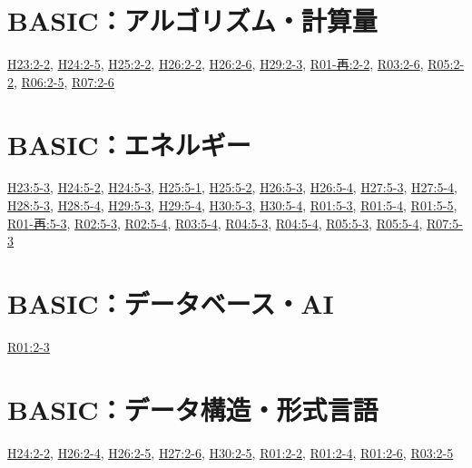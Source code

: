 \section{BASIC：アルゴリズム・計算量}
\hyperref[q:h23-reg-basic-2-2]{H23:2-2}, \hyperref[q:h24-reg-basic-2-5]{H24:2-5}, \hyperref[q:h25-reg-basic-2-2]{H25:2-2}, \hyperref[q:h26-reg-basic-2-2]{H26:2-2}, \hyperref[q:h26-reg-basic-2-6]{H26:2-6}, \hyperref[q:h29-reg-basic-2-3]{H29:2-3}, \hyperref[q:r01-ret-basic-2-2]{R01-再:2-2}, \hyperref[q:r03-reg-basic-2-6]{R03:2-6}, \hyperref[q:r05-reg-basic-2-2]{R05:2-2}, \hyperref[q:r06-reg-basic-2-5]{R06:2-5}, \hyperref[q:r07-reg-basic-2-6]{R07:2-6}
\section{BASIC：エネルギー}
\hyperref[q:h23-reg-basic-5-3]{H23:5-3}, \hyperref[q:h24-reg-basic-5-2]{H24:5-2}, \hyperref[q:h24-reg-basic-5-3]{H24:5-3}, \hyperref[q:h25-reg-basic-5-1]{H25:5-1}, \hyperref[q:h25-reg-basic-5-2]{H25:5-2}, \hyperref[q:h26-reg-basic-5-3]{H26:5-3}, \hyperref[q:h26-reg-basic-5-4]{H26:5-4}, \hyperref[q:h27-reg-basic-5-3]{H27:5-3}, \hyperref[q:h27-reg-basic-5-4]{H27:5-4}, \hyperref[q:h28-reg-basic-5-3]{H28:5-3}, \hyperref[q:h28-reg-basic-5-4]{H28:5-4}, \hyperref[q:h29-reg-basic-5-3]{H29:5-3}, \hyperref[q:h29-reg-basic-5-4]{H29:5-4}, \hyperref[q:h30-reg-basic-5-3]{H30:5-3}, \hyperref[q:h30-reg-basic-5-4]{H30:5-4}, \hyperref[q:r01-reg-basic-5-3]{R01:5-3}, \hyperref[q:r01-reg-basic-5-4]{R01:5-4}, \hyperref[q:r01-reg-basic-5-5]{R01:5-5}, \hyperref[q:r01-ret-basic-5-3]{R01-再:5-3}, \hyperref[q:r02-reg-basic-5-3]{R02:5-3}, \hyperref[q:r02-reg-basic-5-4]{R02:5-4}, \hyperref[q:r03-reg-basic-5-4]{R03:5-4}, \hyperref[q:r04-reg-basic-5-3]{R04:5-3}, \hyperref[q:r04-reg-basic-5-4]{R04:5-4}, \hyperref[q:r05-reg-basic-5-3]{R05:5-3}, \hyperref[q:r05-reg-basic-5-4]{R05:5-4}, \hyperref[q:r07-reg-basic-5-3]{R07:5-3}
\section{BASIC：データベース・AI}
\hyperref[q:r01-reg-basic-2-3]{R01:2-3}
\section{BASIC：データ構造・形式言語}
\hyperref[q:h24-reg-basic-2-2]{H24:2-2}, \hyperref[q:h26-reg-basic-2-4]{H26:2-4}, \hyperref[q:h26-reg-basic-2-5]{H26:2-5}, \hyperref[q:h27-reg-basic-2-6]{H27:2-6}, \hyperref[q:h30-reg-basic-2-5]{H30:2-5}, \hyperref[q:r01-reg-basic-2-2]{R01:2-2}, \hyperref[q:r01-reg-basic-2-4]{R01:2-4}, \hyperref[q:r01-reg-basic-2-6]{R01:2-6}, \hyperref[q:r03-reg-basic-2-5]{R03:2-5}
